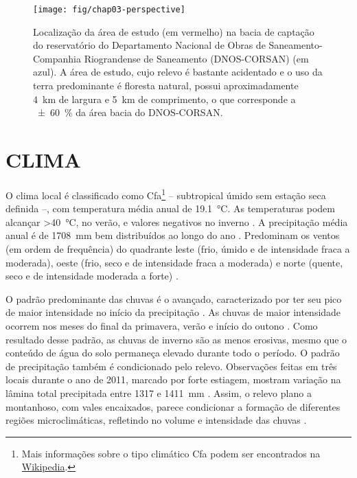 \begin{figure}[!ht]
\centering
\texttt{[image: fig/chap03-perspective]}
\caption[Localização da área de estudo na bacia do DNOS.]{Localização da área de estudo (em vermelho) na 
bacia de captação do reservatório do Departamento Nacional de Obras de Saneamento-Companhia Riograndense de 
Saneamento (DNOS-CORSAN) (em azul). A área de estudo, cujo relevo é bastante acidentado e o uso da terra 
predominante é floresta natural, possui aproximadamente \SI{4}{\km} de largura e \SI{5}{\km} de comprimento, 
o que corresponde a \SI{\pm60}{\percent} da área bacia do DNOS-CORSAN.}
\label{fig:chap03-perspective}
\end{figure}

\section{CLIMA}
\label{sec:chap03-clima}

\def\footcfa{\footnote{Mais informações sobre o tipo climático Cfa podem ser encontrados na 
\href{https://pt.wikipedia.org/wiki/Clima_subtropical_\%C3\%BAmido}{Wikipedia}.}}

O clima local é classificado como Cfa\footcfa{} -- subtropical úmido sem estação seca definida --, com 
temperatura média anual de \SI{19,1}{\celsius}. As temperaturas podem alcançar \SI{>40}{\celsius}, no verão, e 
valores negativos no inverno \cite{HeldweinEtAl2009}. A precipitação média anual é de \SI{1708}{\milli\metre} 
bem distribuídos ao longo do ano \cite{Maluf2000}. Predominam os ventos (em ordem de frequência) do quadrante 
leste (frio, úmido e de intensidade fraca a moderada), oeste (frio, seco e de intensidade fraca a moderada) e 
norte (quente, seco e de intensidade moderada a forte) \cite{HeldweinEtAl2009}.

O padrão predominante das chuvas é o avançado, caracterizado por ter seu pico de maior intensidade no início 
da precipitação \cite{MehlEtAl2001}. As chuvas de maior intensidade ocorrem nos meses do final da primavera, 
verão e início do outono \cite{MouraBueno2012}. Como resultado desse padrão, as chuvas de inverno são as 
menos erosivas, mesmo que o conteúdo de água do solo permaneça elevado durante todo o período. O padrão de 
precipitação também é condicionado pelo relevo. Observações feitas em três locais durante o ano de \num{2011}, 
marcado por forte estiagem, mostram variação na lâmina total precipitada entre \num{1317} e \SI{1411}{\mm} 
\cite{MouraBueno2012}. Assim, o relevo plano a montanhoso, com vales encaixados, parece condicionar a formação 
de diferentes regiões microclimáticas, refletindo no volume e intensidade das chuvas \cite{MouraBueno2012}.


